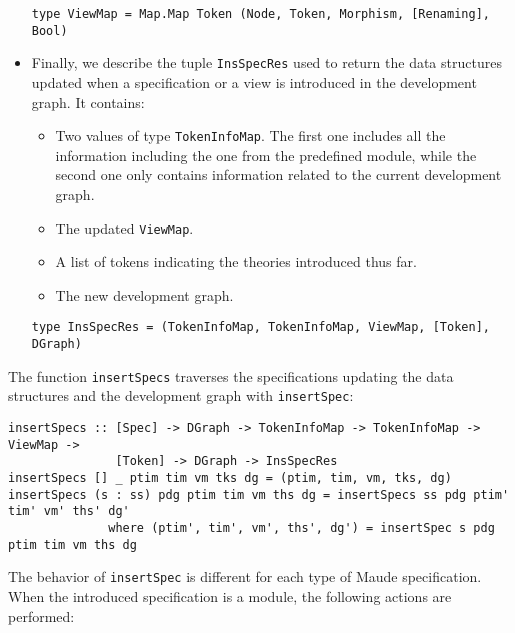 \begin{itemize}
{\codesize
\begin{verbatim}
type ViewMap = Map.Map Token (Node, Token, Morphism, [Renaming], Bool)
\end{verbatim}
}

\item Finally, we describe the tuple \verb"InsSpecRes"
used to return the data structures
updated when a specification or a view is introduced in the development
graph. It contains:

\begin{itemize}
\item Two values of type \verb"TokenInfoMap". The first one includes all
the information including the one from the predefined module, while the
second one only contains information related to the current development
graph.
\item The updated \verb"ViewMap".
\item A list of tokens indicating the theories introduced thus far.
\item The new development graph.
\end{itemize}

{\codesize
\begin{verbatim}
type InsSpecRes = (TokenInfoMap, TokenInfoMap, ViewMap, [Token], DGraph)
\end{verbatim}
}

\end{itemize}

The function \verb"insertSpecs" traverses the specifications updating the
data structures and the development graph with \verb"insertSpec":

{\codesize
\begin{verbatim}
insertSpecs :: [Spec] -> DGraph -> TokenInfoMap -> TokenInfoMap -> ViewMap ->
               [Token] -> DGraph -> InsSpecRes
insertSpecs [] _ ptim tim vm tks dg = (ptim, tim, vm, tks, dg)
insertSpecs (s : ss) pdg ptim tim vm ths dg = insertSpecs ss pdg ptim' tim' vm' ths' dg'
              where (ptim', tim', vm', ths', dg') = insertSpec s pdg ptim tim vm ths dg
\end{verbatim}
}

The behavior of \verb"insertSpec" is different for each type of Maude
specification. When the introduced specification is a module, the
following actions are performed:

